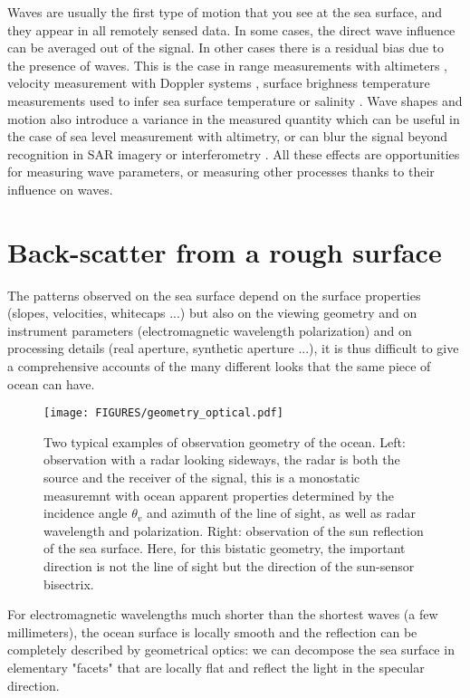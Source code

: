 



Waves are usually the first type of motion that you see at the sea surface, and they appear in all remotely sensed data. In some cases, the direct wave influence can be averaged out of the signal. In other cases there is a residual bias due to the presence of waves. This is the case in 
range measurements with altimeters \citep[e.g.][]{Minster&al.1992}, velocity measurement with Doppler systems
\citep{Chapron&al.2005,Nouguier&al.2018}, surface brighness temperature measurements used to infer 
sea surface temperature or salinity \citep{Reul&Chapron2003}. Wave shapes and motion also introduce a variance in the 
measured quantity which can be useful in the case of sea level measurement with altimetry, or can blur 
the signal beyond recognition in SAR imagery or interferometry \citep{Peral&al.2015}. All these effects are opportunities for measuring wave parameters, or measuring other processes thanks to their influence on waves. 

\section{Back-scatter from a rough surface}
The patterns observed on the sea surface depend on the surface properties (slopes, velocities, whitecaps ...) but also on the viewing geometry and on instrument parameters (electromagnetic wavelength polarization) and on processing details (real aperture, synthetic aperture ...), it is thus difficult to give a comprehensive accounts of the many different looks that the same piece of ocean can have. 


\begin{figure}[htb]
\centerline{\texttt{[image: FIGURES/geometry\_optical.pdf]}}
\caption[]
{Two typical examples of observation geometry of the ocean. Left: observation with a radar looking sideways, the radar is both the source and the receiver of the signal, this is a monostatic measuremnt with ocean apparent properties determined by the incidence angle $\theta_v$ and azimuth of the line of sight, as well as radar wavelength and polarization. Right: observation of the sun reflection of the sea surface. Here, for this bistatic geometry, the important direction is not the line of sight but the direction of the sun-sensor bisectrix. \label{fig:remote_sensing_geometry}}
\end{figure}
For electromagnetic wavelengths much shorter than the shortest waves (a few millimeters), the ocean surface is locally smooth and the reflection can be completely described by geometrical optics: we can decompose the sea surface in elementary "facets" that are locally flat and reflect the light in the specular direction. 


